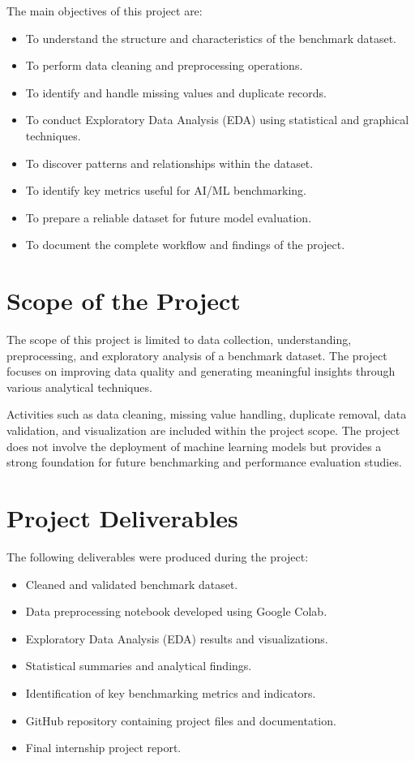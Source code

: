 \documentclass[12pt,a4paper]{report}
\begin{document}
The main objectives of this project are:

\begin{itemize}
\item To understand the structure and characteristics of the benchmark dataset.
\item To perform data cleaning and preprocessing operations.
\item To identify and handle missing values and duplicate records.
\item To conduct Exploratory Data Analysis (EDA) using statistical and graphical techniques.
\item To discover patterns and relationships within the dataset.
\item To identify key metrics useful for AI/ML benchmarking.
\item To prepare a reliable dataset for future model evaluation.
\item To document the complete workflow and findings of the project.
\end{itemize}

\section{Scope of the Project}

The scope of this project is limited to data collection, understanding, preprocessing, and exploratory analysis of a benchmark dataset. The project focuses on improving data quality and generating meaningful insights through various analytical techniques.

Activities such as data cleaning, missing value handling, duplicate removal, data validation, and visualization are included within the project scope. The project does not involve the deployment of machine learning models but provides a strong foundation for future benchmarking and performance evaluation studies.

\section{Project Deliverables}

The following deliverables were produced during the project:

\begin{itemize}
\item Cleaned and validated benchmark dataset.
\item Data preprocessing notebook developed using Google Colab.
\item Exploratory Data Analysis (EDA) results and visualizations.
\item Statistical summaries and analytical findings.
\item Identification of key benchmarking metrics and indicators.
\item GitHub repository containing project files and documentation.
\item Final internship project report.
\end{itemize}
\end{document}
